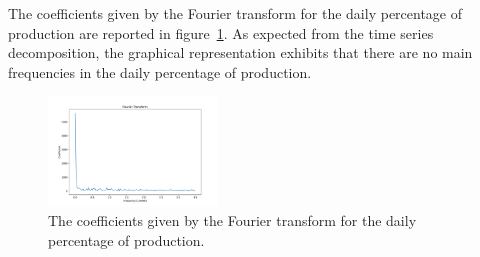 The coefficients given by the Fourier transform for the daily percentage of production are reported in figure~\ref{fig:productionftday}.
As expected from the time series decomposition, the graphical representation exhibits that there are no main frequencies in the daily percentage of production.

\begin{figure}[H]
\centering
\includegraphics[width=0.4\textwidth]{images/production/ft_day}
\caption{The coefficients given by the Fourier transform for the daily percentage of production.}
\label{fig:productionftday}
\end{figure}

